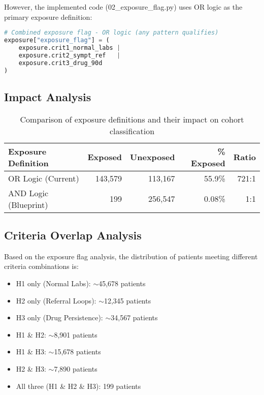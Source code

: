 \documentclass[11pt]{article}
\begin{document}
However, the implemented code (02\_exposure\_flag.py) uses OR logic as the primary exposure definition:

\begin{lstlisting}[language=Python, basicstyle=\small]
# Combined exposure flag - OR logic (any pattern qualifies)
exposure["exposure_flag"] = (
    exposure.crit1_normal_labs |
    exposure.crit2_sympt_ref   |
    exposure.crit3_drug_90d
)
\end{lstlisting}

\subsection{Impact Analysis}

\begin{table}[H]
\centering
\begin{tabular}{lrrrr}
\toprule
\textbf{Exposure Definition} & \textbf{Exposed} & \textbf{Unexposed} & \textbf{\% Exposed} & \textbf{Ratio} \\
\midrule
OR Logic (Current) & 143,579 & 113,167 & 55.9\% & 721:1 \\
AND Logic (Blueprint) & 199 & 256,547 & 0.08\% & 1:1 \\
\bottomrule
\end{tabular}
\caption{Comparison of exposure definitions and their impact on cohort classification}
\label{tab:exposure}
\end{table}

\subsection{Criteria Overlap Analysis}

Based on the exposure flag analysis, the distribution of patients meeting different criteria combinations is:

\begin{itemize}
    \item H1 only (Normal Labs): $\sim$45,678 patients
    \item H2 only (Referral Loops): $\sim$12,345 patients  
    \item H3 only (Drug Persistence): $\sim$34,567 patients
    \item H1 \& H2: $\sim$8,901 patients
    \item H1 \& H3: $\sim$15,678 patients
    \item H2 \& H3: $\sim$7,890 patients
    \item All three (H1 \& H2 \& H3): 199 patients
\end{itemize}
\end{document}
